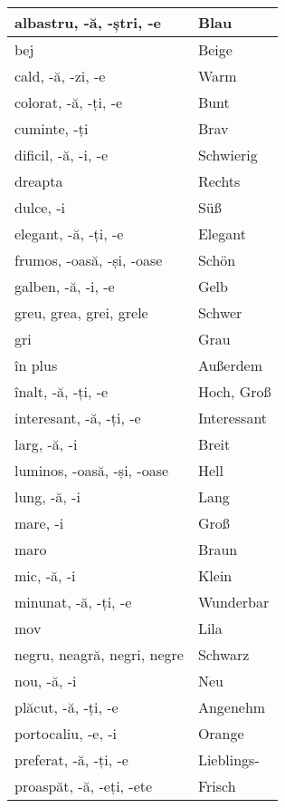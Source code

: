 \documentclass[11pt, oneside]{article}
\begin{document}
\begin{center}
  \begin{tabular}{ | p{6cm}| p{6cm} | } 
    \hline
    albastru, -ă, -ștri, -e & Blau\\
    \hline
    bej & Beige\\
    \hline
    cald, -ă, -zi, -e & Warm\\
    \hline
    colorat, -ă, -ți, -e & Bunt\\
    \hline
    cuminte, -ți & Brav\\
    \hline
    dificil, -ă, -i, -e & Schwierig\\
    \hline
    dreapta & Rechts\\
    \hline
    dulce, -i & Süß\\
    \hline
    elegant, -ă, -ți, -e & Elegant\\
    \hline
    frumos, -oasă, -și, -oase & Schön\\
    \hline
    galben, -ă, -i, -e & Gelb\\
    \hline
    greu, grea, grei, grele & Schwer\\
    \hline
    gri & Grau\\
    \hline
    în plus & Außerdem\\
    \hline
    înalt, -ă, -ți, -e & Hoch, Groß\\
    \hline
    interesant, -ă, -ți, -e & Interessant\\
    \hline
    larg, -ă, -i & Breit\\
    \hline
    luminos, -oasă, -și, -oase & Hell\\
    \hline
    lung, -ă, -i & Lang\\
    \hline
    mare, -i & Groß\\
    \hline
    maro & Braun\\
    \hline
    mic, -ă, -i & Klein\\
    \hline
    minunat, -ă, -ți, -e & Wunderbar\\
    \hline
    mov & Lila\\
    \hline
    negru, neagră, negri, negre & Schwarz\\
    \hline
    nou, -ă, -i & Neu\\
    \hline
    plăcut, -ă, -ți, -e & Angenehm\\
    \hline
    portocaliu, -e, -i & Orange\\
    \hline
    preferat, -ă, -ți, -e & Lieblings-\\
    \hline
    proaspăt, -ă, -eți, -ete & Frisch\\

\end{tabular}
\end{center}
\end{document}
